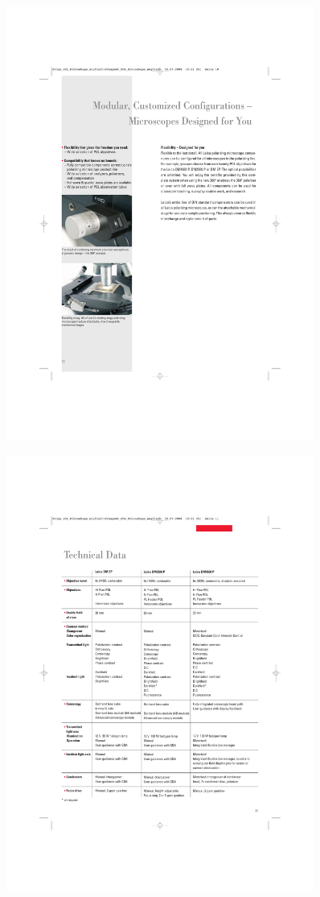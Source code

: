 \begin{figure}[h!]
	\centering
	\includegraphics[width=0.9\textwidth]{afbeeldingen/manual_cut_3.pdf}
\end{figure}
\newpage
\begin{figure}[h!]
	\centering
	\includegraphics[width=0.9\textwidth]{afbeeldingen/manual_cut_2.pdf}
\end{figure}
